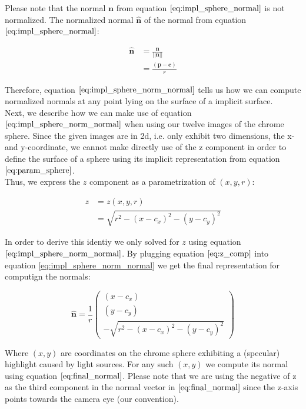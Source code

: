 \documentclass{paper}
\begin{document}
Please note that the normal $\textbf{n}$ from equation $\ref{eq:impl_sphere_normal}$ is not 
normalized. The normalized normal $\hat{\textbf{n}}$ of the normal from equation $\ref{eq:impl_sphere_normal}$:

\begin{align}
\hat{\textbf{n}}
&= \frac{\textbf{n}}{||\textbf{n}||} \nonumber \\
&= \frac{(\textbf{p}-\textbf{c})}{r}
\label{eq:impl_sphere_norm_normal}
\end{align}

Therefore, equation $\ref{eq:impl_sphere_norm_normal}$ tells us how we can compute normalized normals at any point lying on the surface of a implicit surface. \\

Next, we describe how we can make use of equation $\ref{eq:impl_sphere_norm_normal}$ when using our twelve images of the chrome sphere. Since the given images are in 2d, i.e. only exhibit two dimensions, the x-and y-coordinate, we cannot make directly use of the z component in order to define the surface of a sphere using its implicit representation from equation $\ref{eq:param_sphere}$. \\

Thus, we express the $z$ component as a parametrization of $(x,y,r)$:

\begin{align}
z 
&= z(x,y,r) \nonumber \\
&= \sqrt{r^2 - (x-c_x)^2 - (y-c_y)^2}
\label{eq:z_comp}
\end{align}

In order to derive this identiy we only solved for $z$ using equation $\ref{eq:impl_sphere_norm_normal}$. By plugging equation $\ref{eq:z_comp}$ into equation \ref{eq:impl_sphere_norm_normal} we get the final representation for computign the normals:

\begin{equation}
    \hat{\textbf{n}} = 
    \frac{1}{r}\left(
        \begin{array}{c}
            (x-c_{x}) \\
            (y-c_{y}) \\
            -\sqrt{r^2 - (x-c_x)^2 - (y-c_y)^2}
        \end{array}
    \right)
\label{eq:final_normal}
\end{equation}

Where $(x,y)$ are coordinates on the chrome sphere exhibiting a (specular) highlight caused by light sources. For any such $(x,y)$ we compute its normal using equation $\ref{eq:final_normal}$. Please note that we are using the negative of z as the third component in the normal vector in $\ref{eq:final_normal}$ since the z-axis points towards the camera eye (our convention).  \\
\end{document}
